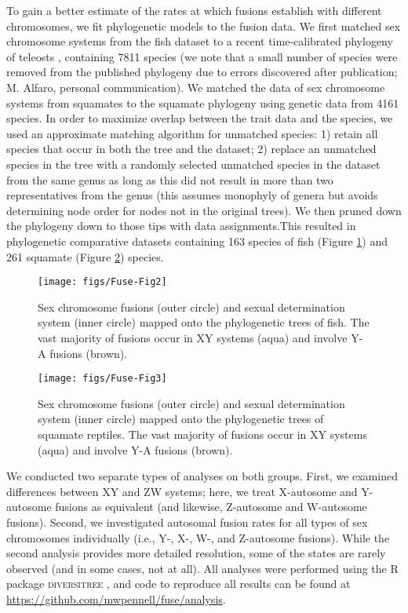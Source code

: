 To gain a better estimate of the rates at which fusions establish with different chromosomes, we fit phylogenetic models to the fusion data. We first matched sex chromosome systems from the fish dataset to a recent time-calibrated phylogeny of teleosts \citep{Rabosky2013}, containing 7811 species (we note that a small number of species were removed from the published phylogeny due to errors discovered after publication; M. Alfaro, personal communication). We matched the data of sex chromosome systems from squamates to the squamate phylogeny \citep{Pyron2013, PyronBurbrink2013} using genetic data from 4161 species. In order to maximize overlap between the trait data and the species, we used an approximate matching algorithm for unmatched species: 1) retain all species that occur in both the tree and the dataset; 2) replace an unmatched species in the tree with a randomly selected unmatched species in the dataset from the same genus as long as this did not result in more than two representatives from the genus (this assumes monophyly of genera but avoids determining node order for nodes not in the original trees). We then pruned down the phylogeny down to those tips with data assignments.This resulted in phylogenetic comparative datasets containing 163 species of fish (Figure \ref{fig:phylo-fish}) and 261 squamate (Figure \ref{fig:phylo-squa}) species.

\begin{figure}
\centering
\texttt{[image: figs/Fuse-Fig2]}
\caption[Phylogenetic distribution of sex chromosome fusions in fish]{Sex chromosome fusions (outer circle) and sexual determination system (inner circle) mapped onto the phylogenetic trees of fish. The vast majority of fusions occur in XY systems (aqua) and involve Y-A fusions (brown).}
\label{fig:phylo-fish}
\end{figure}

\begin{figure}
\centering
\texttt{[image: figs/Fuse-Fig3]}
\caption[Phylogenetic distribution of sex chromosome fusions in squamates]{Sex chromosome fusions (outer circle) and sexual determination system (inner circle) mapped onto the phylogenetic trees of squamate reptiles. The vast majority of fusions occur in XY systems (aqua) and involve Y-A fusions (brown).}
\label{fig:phylo-squa}
\end{figure}



We conducted two separate types of analyses on both groups. First, we examined differences between XY and ZW systems; here, we treat X-autosome and Y-autosome fusions as equivalent (and likewise, Z-autosome and W-autosome fusions). Second, we investigated autosomal fusion rates for all types of sex chromosomes individually (i.e., Y-, X-, W-, and Z-autosome fusions). While the second analysis provides more detailed resolution, some of the states are rarely observed (and in some cases, not at all). All analyses were performed using the R package \textsc{diversitree} \citep{FitzJohn2012}, and code to reproduce all results can be found at \url{https://github.com/mwpennell/fuse/analysis}. 

